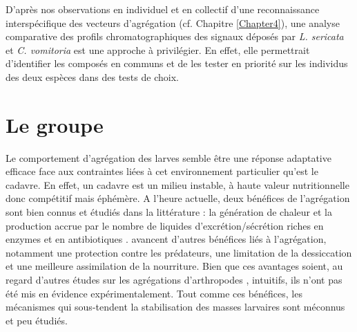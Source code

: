 D'après nos observations en individuel et en collectif d'une reconnaissance interspécifique des vecteurs d'agrégation (cf. Chapitre \ref{Chapter4}), une analyse comparative des profils chromatographiques des signaux déposés par \textit{L. sericata} et \textit{C. vomitoria} est une approche à privilégier. En effet, elle permettrait d'identifier les composés en communs et de les tester en priorité sur les individus des deux espèces dans des tests de choix.
            


		\section{Le groupe}
Le comportement d'agrégation des larves semble être une réponse adaptative efficace face aux contraintes liées à cet environnement particulier qu'est le cadavre. En effet, un cadavre est un milieu instable, à haute valeur nutritionnelle donc compétitif mais éphémère. A l'heure actuelle, deux bénéfices de l'agrégation sont bien connus et étudiés dans la littérature : la génération de chaleur \citep{slone_thermoregulation_2007,charabidze_larval-mass_2011} et la production accrue par le nombre de liquides d'excrétion/sécrétion riches en enzymes et en antibiotiques \citep{wilson_impacts_2015,sandeman_tryptic_1990}. \citet{rivers_physiological_2011} avancent d'autres bénéfices liés à l'agrégation, notamment une protection contre les prédateurs, une limitation de la dessiccation et une meilleure assimilation de la nourriture. Bien que ces avantages soient, au regard d'autres études sur les agrégations d'arthropodes \cite{jeanson_key_2012}, intuitifs, ils n'ont pas été mis en évidence expérimentalement. Tout comme ces bénéfices, les mécanismes qui sous-tendent la stabilisation des masses larvaires sont méconnus et peu étudiés.

